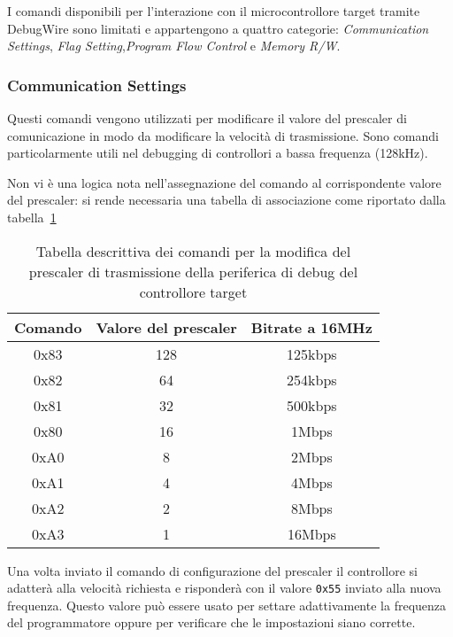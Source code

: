 I comandi disponibili per l'interazione con il microcontrollore target tramite DebugWire sono limitati e appartengono a quattro categorie: \textit{Communication Settings}, \textit{Flag Setting},\textit{Program Flow Control} e \textit{Memory R/W}.

\subsubsection{Communication Settings}

Questi comandi vengono utilizzati per modificare il valore del prescaler di comunicazione in modo da modificare la velocità di trasmissione. Sono comandi particolarmente utili nel debugging di controllori a bassa frequenza (128kHz).

Non vi è una logica nota nell'assegnazione del comando al corrispondente valore del prescaler: si rende necessaria una tabella di associazione come riportato dalla tabella~\ref{tab:dw-presc-settings}

\begin{table}[h]
    \centering
    \begin{tabular}{ c c c }
        \textbf{Comando} & \textbf{Valore del prescaler} & \textbf{Bitrate a 16MHz} \\
        \hline
        0x83 & 128 & 125kbps \\
        0x82 & 64 & 254kbps \\
        0x81 & 32 & 500kbps \\
        0x80 & 16 & 1Mbps \\
        0xA0 & 8 & 2Mbps \\
        0xA1 & 4 & 4Mbps \\
        0xA2 & 2 & 8Mbps \\
        0xA3 & 1 & 16Mbps \\
        \hline
    \end{tabular}
    \caption[]{Tabella descrittiva dei comandi per la modifica del prescaler di trasmissione della periferica di debug del controllore target\cite{site:dw-reverse-engeneering}}\label{tab:dw-presc-settings}
\end{table}

Una volta inviato il comando di configurazione del prescaler il controllore si adatterà alla velocità richiesta e risponderà con il valore \texttt{0x55} inviato alla nuova frequenza. Questo valore può essere usato per settare adattivamente la frequenza del programmatore oppure per verificare che le impostazioni siano corrette.

